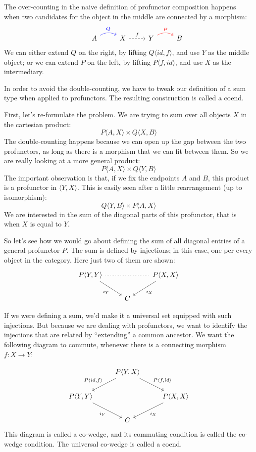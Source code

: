 \documentclass[DaoFP]{subfiles}
\begin{document}
The over-counting in the naive definition of profunctor composition happens when two candidates for the object in the middle are connected by a morphism:
\[
 \begin{tikzcd}
  & A
  \arrow[r, bend left, blue, "Q"]
  &X
  \arrow[r, dashed, "f"]
 & Y
  \arrow[r, bend left, red, "P"]
 & B
  \end{tikzcd}
\]
We can either extend $Q$ on the right, by lifting $Q \langle id, f \rangle$, and use $Y$ as the middle object; or we can extend $P$ on the left, by lifting $P \langle f, id \rangle$, and use $X$ as the intermediary.

In order to avoid the double-counting, we have to tweak our definition of a sum type when applied to profunctors. The resulting construction is called a coend. 

First, let's re-formulate the problem. We are trying to sum over all objects $X$ in the cartesian product:
\[ P \langle A, X \rangle \times Q \langle X, B \rangle \]
The double-counting happens because we can open up the gap between the two profunctors, as long as there is a morphism that we can fit between them. So we are really looking at a more general product:
\[ P \langle A, X \rangle \times Q \langle Y, B \rangle \]
The important observation is that, if we fix the endpoints $A$ and $B$, this product is a profunctor in $\langle Y, X \rangle$. This is easily seen after a little rearrangement (up to isomorphism):
\[ Q \langle Y, B \rangle \times P \langle A, X \rangle \]
We are interested in the sum of the diagonal parts of this profunctor, that is when $X$ is equal to $Y$. 

So let's see how we would go about defining the sum of all diagonal entries of a general profunctor $P$. The sum is defined by injections; in this case, one per every object in the category. Here just two of them are shown:
\[
 \begin{tikzcd}
 P \langle Y, Y \rangle
 \arrow[dr, "i_Y"']
 \arrow[rr, dash, dotted]
 &&P \langle X, X \rangle
 \arrow[dl, "i_X"]
 \\
 &C
 \end{tikzcd}
\]

If we were defining a sum, we'd make it a universal set equipped with such injections. But because we are dealing with profunctors, we want to identify the injections that are related by ``extending'' a common ancestor. We want the following diagram to commute, whenever there is a connecting morphism $f\colon X \to Y$:

\[
 \begin{tikzcd}
 &P \langle Y, X \rangle
 \arrow[ld, "{P \langle id, f \rangle}"']
 \arrow[rd, "{P \langle f, id \rangle}"]
 \\
 P \langle Y, Y \rangle
 \arrow[dr, "i_Y"']
 &&P \langle X, X \rangle
 \arrow[dl, "i_X"]
 \\
 &C
 \end{tikzcd}
\]
This diagram is called a co-wedge, and its commuting condition is called the co-wedge condition. The universal co-wedge is called a coend.
\end{document}
